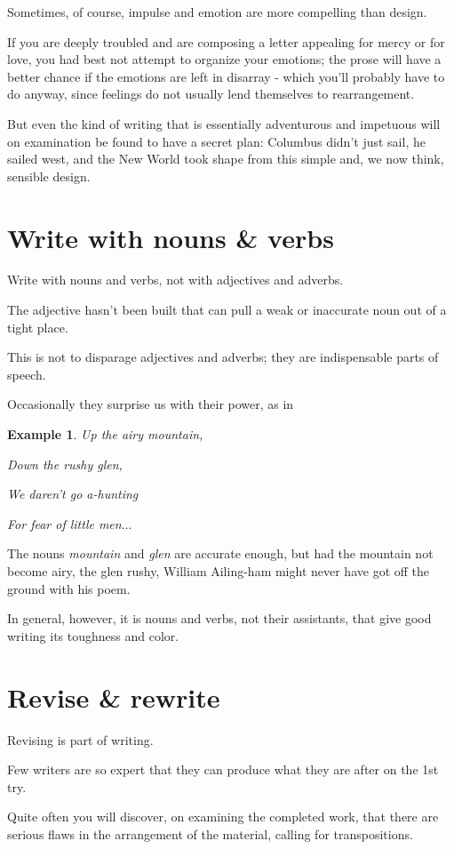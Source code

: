 \documentclass{book}
\numberwithin{equation}{section}
\newtheorem{example}{Example}[chapter]
\begin{document}
%
Sometimes, of course, impulse and emotion are more compelling than design.

If you are deeply troubled and are composing a letter appealing for mercy or for love, you had best not attempt to organize your emotions; the prose will have a better chance if the emotions are left in disarray - which you'll probably have to do anyway, since feelings do not usually lend themselves to rearrangement.

But even the kind of writing that is essentially adventurous and impetuous will on examination be found to have a secret plan: Columbus didn't just sail, he sailed west, and the New World took shape from this simple and, we now think, sensible design.

\section{Write with nouns \& verbs}
Write with nouns and verbs, not with adjectives and adverbs.

The adjective hasn't been built that can pull a weak or inaccurate noun out of a tight place.

This is not to disparage adjectives and adverbs; they are indispensable parts of speech.

Occasionally they surprise us with their power, as in
\begin{example}
    Up the airy mountain,
    
    Down the rushy glen,
    
    We daren't go a-hunting
    
    For fear of little men$\ldots$
\end{example}
The nouns \textit{mountain} and \textit{glen} are accurate enough, but had the mountain not become airy, the glen rushy, William Ailing-ham might never have got off the ground with his poem.

In general, however, it is nouns and verbs, not their assistants, that give good writing its toughness and color.

\section{Revise \& rewrite}
Revising is part of writing.

Few writers are so expert that they can produce what they are after on the 1st try.

Quite often you will discover, on examining the completed work, that there are serious flaws in the arrangement of the material, calling for transpositions.
\end{document}
